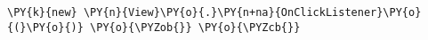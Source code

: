 \begin{Verbatim}[commandchars=\\\{\}]
\PY{k}{new} \PY{n}{View}\PY{o}{.}\PY{n+na}{OnClickListener}\PY{o}{(}\PY{o}{)} \PY{o}{\PYZob{}} \PY{o}{\PYZcb{}}
\end{Verbatim}

